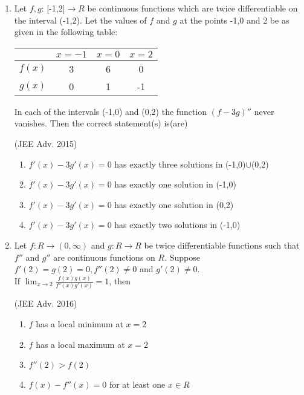 \documentclass[journal,12pt,twocolumn]{IEEEtran}
\theoremstyle{remark}
\begin{document}
\begin{enumerate}[start = 7]
{        }
    \item{
        
            Let $f,g$: [-1,2]$\rightarrow R$ be continuous functions which are twice differentiable on the interval (-1,2). Let the values of $f$ and $g$ at the points -1,0 and 2 be as given in the following table:
            \begin{center}
            \begin{tabular}{|c|c|c|c|} 
              \hline
               & $x=-1$ & $x = 0$ & $x = 2$ \\ 
              \hline
               $f(x)$& 3 & 6 & 0\\ 
              \hline
               $g(x)$ & 0 & 1 & -1\\ 
              \hline
            \end{tabular}
            \end{center}  
            In each of the intervals (-1,0) and (0,2) the function $(f-3g)''$ never vanishes. Then the correct statement(s) is(are)
            \begin{flushright}
                {(JEE Adv. 2015)}
            \end{flushright}
            \begin{enumerate}
                \item $f'(x) - 3g'(x) = 0$ has exactly three solutions in (-1,0)$\cup$(0,2)
                \item $f'(x) - 3g'(x) = 0$ has exactly one solution in (-1,0)
                \item $f'(x) - 3g'(x) = 0$ has exactly one solution in (0,2)
                \item $f'(x) - 3g'(x) = 0$ has exactly two solutions in (-1,0)
            \end{enumerate}
        
        }
    \item{
        
            Let $f: R\rightarrow (0,\infty)$ and $g: R\rightarrow R$ be twice differentiable functions such that $f''$ and $g''$ are continuous functions on $R$. Suppose $f'(2) = g(2)=0, f''(2) \neq0$ and $g'(2)\neq0$.\\[6pt] If $\lim_{x\to2} \displaystyle \frac{f(x)g(x)}{f'(x)g'(x)} = 1$, then
            \begin{flushright}
                {(JEE Adv. 2016)}
            \end{flushright}
            \begin{enumerate}
                \item $f$ has a local minimum at $x=2$
                \item $f$ has a local maximum at $x=2$
                \item $f''(2)>f(2)$
                \item $f(x) - f''(x) = 0$ for at least one $x\in R$
            \end{enumerate}
        
}
\end{enumerate}
\end{document}
